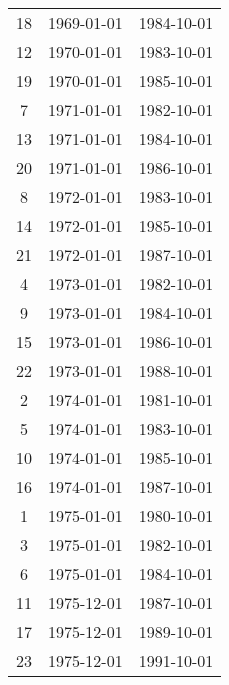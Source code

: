 % 
\begin{tabular}{ccc}
  \hline
  \hline
18 & 1969-01-01 & 1984-10-01 \\ 
  12 & 1970-01-01 & 1983-10-01 \\ 
  19 & 1970-01-01 & 1985-10-01 \\ 
  7 & 1971-01-01 & 1982-10-01 \\ 
  13 & 1971-01-01 & 1984-10-01 \\ 
  20 & 1971-01-01 & 1986-10-01 \\ 
  8 & 1972-01-01 & 1983-10-01 \\ 
  14 & 1972-01-01 & 1985-10-01 \\ 
  21 & 1972-01-01 & 1987-10-01 \\ 
  4 & 1973-01-01 & 1982-10-01 \\ 
  9 & 1973-01-01 & 1984-10-01 \\ 
  15 & 1973-01-01 & 1986-10-01 \\ 
  22 & 1973-01-01 & 1988-10-01 \\ 
  2 & 1974-01-01 & 1981-10-01 \\ 
  5 & 1974-01-01 & 1983-10-01 \\ 
  10 & 1974-01-01 & 1985-10-01 \\ 
  16 & 1974-01-01 & 1987-10-01 \\ 
  1 & 1975-01-01 & 1980-10-01 \\ 
  3 & 1975-01-01 & 1982-10-01 \\ 
  6 & 1975-01-01 & 1984-10-01 \\ 
  11 & 1975-12-01 & 1987-10-01 \\ 
  17 & 1975-12-01 & 1989-10-01 \\ 
  23 & 1975-12-01 & 1991-10-01 \\ 
   \hline
\end{tabular}
